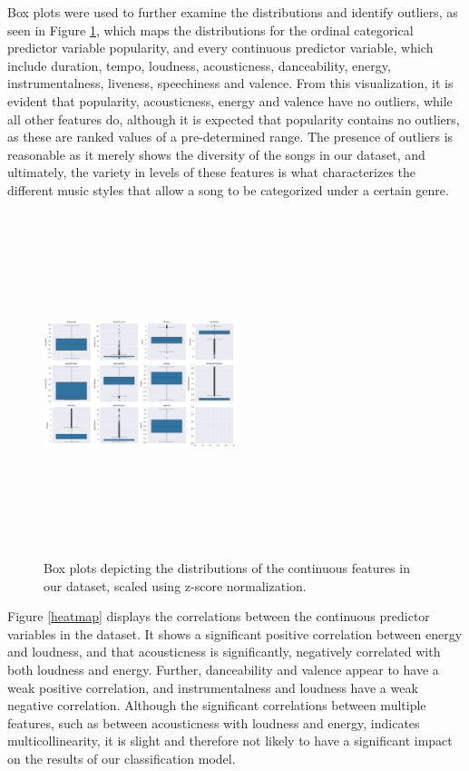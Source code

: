 \documentclass[times, twocolumn]{article}
\begin{document}
Box plots were used to further examine the distributions and identify outliers, as seen in Figure \ref{Boxplots}, which maps the distributions for the ordinal categorical predictor variable popularity, and every continuous predictor variable, which include duration, tempo, loudness, acousticness, danceability, energy, instrumentalness, liveness, speechiness and valence. From this visualization, it is evident that popularity, acousticness, energy and valence have no outliers, while all other features do, although it is expected that popularity contains no outliers, as these are ranked values of a pre-determined range. The presence of outliers is reasonable as it merely shows the diversity of the songs in our dataset, and ultimately, the variety in levels of these features is what characterizes the different music styles that allow a song to be categorized under a certain genre.
\begin{figure}[H]
    \centering
    \includegraphics[width=0.5\textwidth, height=10cm]{feat_boxplots.png}
    \caption{Box plots depicting the distributions of the continuous features in our dataset, scaled using z-score normalization.}
    \label{Boxplots}
\end{figure}
Figure \ref{heatmap} displays the correlations between the continuous predictor variables in the dataset. It shows a significant positive correlation between energy and loudness, and that acousticness is significantly, negatively correlated with both loudness and energy. Further, danceability and valence appear to have a weak positive correlation, and instrumentalness and loudness have a weak negative correlation. Although the significant correlations between multiple features, such as between acousticness with loudness and energy, indicates multicollinearity, it is slight and therefore not likely to have a significant impact on the results of our classification model.
\end{document}
